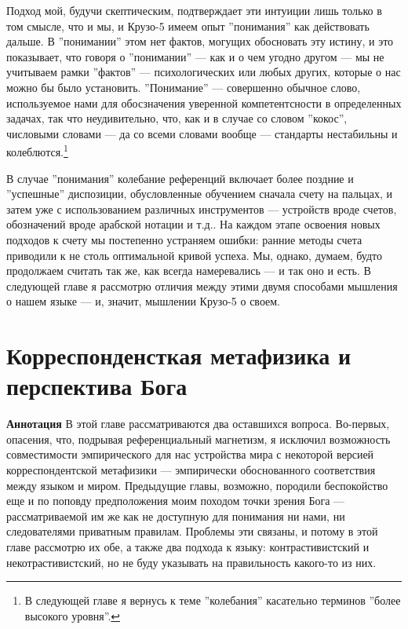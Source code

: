 \documentclass[11pt]{book}
\begin{document}
Подход мой, будучи скептическим, подтверждает эти интуиции лишь только в том смысле, что и мы, и Крузо-5 имеем опыт ''понимания'' как действовать дальше. В ''понимании'' этом нет фактов, могущих обосновать эту истину, и это показывает, что говоря о ''понимании'' --- как и о чем угодно другом --- мы не учитываем рамки ''фактов'' --- психологических или любых других, которые о нас можно бы было установить. ''Понимание'' --- совершенно обычное слово, используемое нами для обосзначения уверенной компетентсности в определенных задачах, так что неудивительно, что, как и в случае со словом ''кокос'', числовыми словами --- да со всеми словами вообще --- стандарты нестабильны и колеблются.\footnote{В следующей главе я вернусь к теме ''колебания'' касательно терминов ''более высокого уровня''.}

В случае ''понимания'' колебание референций включает более поздние и ''успешные'' диспозиции, обусловленные обучением сначала счету на пальцах, и затем уже с использованием различных инструментов --- устройств вроде счетов, обозначений вроде арабской нотации и т.д.. На каждом этапе освоения новых подходов к счету мы постепенно устраняем ошибки: ранние методы счета приводили к не столь оптимальной кривой успеха. Мы, однако, думаем, будто продолжаем считать так же, как всегда намеревались --- и так оно и есть. В следующей главе я рассмотрю отличия между этими двумя способами мышления о нашем языке --- и, значит, мышлении Крузо-5 о своем.

\chapter{Корреспонденсткая метафизика и перспектива Бога}

\qquad

\textbf{Аннотация} \quad В этой главе рассматриваются два оставшихся вопроса. Во-первых, опасения, что, подрывая референциальный магнетизм, я исключил возможность совместимости эмпирического для нас устройства мира с некоторой версией корреспондентской метафизики --- эмпирически обоснованного соответствия между языком и миром. Предыдущие главы, возможно, породили беспокойство еще и по поповду предположения моим походом точки зрения Бога --- рассматриваемой им же как не доступную для понимания ни нами, ни следователями приватным правилам. Проблемы эти связаны, и потому в этой главе рассмотрю их обе, а также два подхода к языку: контрастивистский и некотрастивистский, но не буду указывать на правильность какого-то из них.
\end{document}
